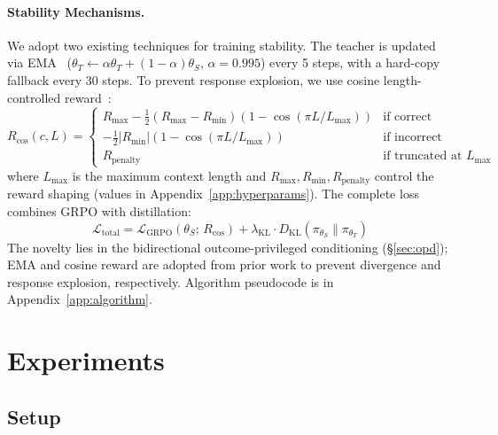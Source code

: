 \documentclass{article}
\begin{document}
\paragraph{Stability Mechanisms.}
We adopt two existing techniques for training stability. The teacher is updated via EMA~\citep{tarvainen2017meanteacher} ($\theta_T \leftarrow \alpha \theta_T + (1-\alpha)\theta_S$, $\alpha{=}0.995$) every 5 steps, with a hard-copy fallback every 30 steps. To prevent response explosion, we use cosine length-controlled reward~\citep{yeo2025cosine}:
\begin{equation}
    R_{\text{cos}}(c, L) = \begin{cases}
        R_{\text{max}} - \frac{1}{2}(R_{\text{max}} - R_{\text{min}})(1 - \cos(\pi L / L_{\text{max}})) & \text{if correct} \\[3pt]
        -\frac{1}{2}|R_{\text{min}}|(1 - \cos(\pi L / L_{\text{max}})) & \text{if incorrect} \\[3pt]
        R_{\text{penalty}} & \text{if truncated at } L_{\text{max}}
    \end{cases}
\label{eq:cosine_reward}
\end{equation}
where $L_{\text{max}}$ is the maximum context length and $R_{\text{max}}, R_{\text{min}}, R_{\text{penalty}}$ control the reward shaping (values in Appendix~\ref{app:hyperparams}). The complete loss combines GRPO with distillation:
\begin{equation}
    \mathcal{L}_{\text{total}} = \mathcal{L}_{\text{GRPO}}(\theta_S;\, R_{\text{cos}}) + \lambda_{\text{KL}} \cdot D_\text{KL}\!\left(\pi_{\theta_S} \| \pi_{\theta_T}\right)
    \label{eq:full_objective}
\end{equation}
The novelty lies in the bidirectional outcome-privileged conditioning (\S\ref{sec:opd}); EMA and cosine reward are adopted from prior work to prevent divergence and response explosion, respectively. Algorithm pseudocode is in Appendix~\ref{app:algorithm}.


\section{Experiments}
\label{sec:eval}

\subsection{Setup}
\label{sec:setup}
\end{document}
